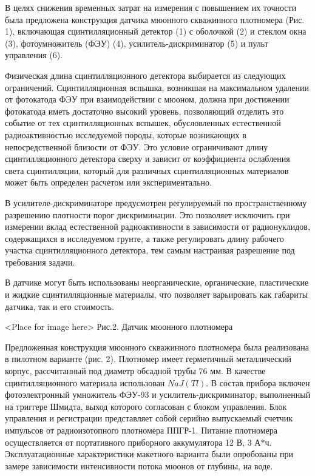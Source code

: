 \documentclass[a4paper,10pt]{article}
\begin{document}
В целях снижения временных затрат на измерения с повышением 
их точности была предложена конструкция датчика мюонного 
скважинного плотномера (Рис. 1), включающая сцинтилляционный 
детектор (1) с оболочкой (2) и стеклом окна (3), 
фотоумножитель (ФЭУ) (4), усилитель-дискриминатор (5) 
и пульт управления (6).

Физическая длина сцинтилляционного детектора выбирается из 
следующих ограничений. Сцинтилляционная вспышка, 
возникшая на максимальном удалении от фотокатода ФЭУ 
при взаимодействии с мюоном, должна при достижении фотокатода 
иметь достаточно высокий уровень, позволяющий отделить это 
событие от тех сцинтилляционных вспышек, обусловленных 
естественной радиоактивностью исследуемой породы, которые 
возникающих в непосредственной близости от ФЭУ. Это условие 
ограничивают длину сцинтилляционного детектора сверху и 
зависит от коэффициента ослабления света сцинтилляции, 
который для различных сцинтилляционных материалов может 
быть определен расчетом или экспериментально. 

В усилителе-дискриминаторе предусмотрен регулируемый по 
пространственному разрешению плотности порог дискриминации. 
Это позволяет исключить при измерении вклад естественной 
радиоактивности в зависимости от радионуклидов, содержащихся в 
исследуемом грунте, а также регулировать длину рабочего участка 
сцинтилляционного детектора, тем самым настраивая разрешение под 
требования задачи.

В датчике могут быть использованы неорганические, 
органические, пластические и жидкие сцинтилляционные материалы,
что позволяет варьировать как габариты датчика, 
так и его стоимость. 


\begin{center}
<Place for image here>
Рис.2. Датчик мюонного плотномера
\end{center}

Предложенная конструкция мюонного скважинного плотномера была 
реализована в пилотном варианте (рис. 2). Плотномер имеет 
герметичный металлический корпус, рассчитанный под диаметр 
обсадной трубы 76 мм. В качестве сцинтилляционного материала 
использован $NaJ(Tl)$. В состав прибора включен 
фотоэлектронный умножитель ФЭУ-93 и  усилитель-дискриминатор, 
выполненный на триггере Шмидта, выход которого согласован с 
блоком управления. Блок управления и регистрации представляет 
собой серийно выпускаемый счетчик импульсов от радиоизотопного 
плотномера ППГР-1. Питание плотномера осуществляется от 
портативного приборного аккумулятора 12 В, 3 А$*$ч. 
Эксплуатационные характеристики макетного варианта 
были опробованы при замере зависимости интенсивности потока 
мюонов от глубины, на воде. 
\end{document}
